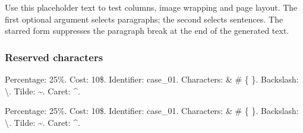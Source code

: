 \begin{referencecode}
\usepackage{lipsum}
\end{referencecode}
\begin{referencecode}
\lipsum[1]          %
\lipsum[1-2][1]     %
\lipsum[1][1-3]     %
\lipsum*[2][1-3]    %
\end{referencecode}

\lipsum[1]          %
\lipsum[1-2][1]     %
\lipsum[1][1-3]     %
\lipsum*[2][1-3]    %
\par
Use this placeholder text to test columns, image wrapping and page layout.
The first optional argument selects paragraphs; the second selects sentences.
The starred form suppresses the paragraph break at the end of the generated text.

\subsubsection*{Reserved characters}
\begin{referencecode}
Percentage: 25\%. Cost: 10\$. Identifier: case\_01.
Characters: \& \# \{ \}.
Backslash: \textbackslash{}. Tilde: \textasciitilde{}.
Caret: \textasciicircum{}.
\end{referencecode}

Percentage: 25\%. Cost: 10\$. Identifier: case\_01.
Characters: \& \# \{ \}.
Backslash: \textbackslash{}. Tilde: \textasciitilde{}.
Caret: \textasciicircum{}.
